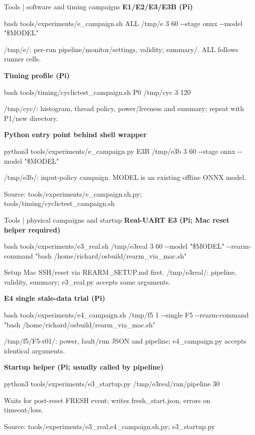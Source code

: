 \documentclass[aspectratio=169,12pt,t]{beamer}
\newcommand{\src}[1]{\par\vfill{\small\color{muted}Source: #1}}
\begin{document}
\begin{frame}{Tools | software and timing campaigns}
\textbf{E1/E2/E3/E3B (Pi)}\par{\ttfamily bash tools/experiments/e\_campaign.sh ALL /tmp/e 3 60 -{}-stage onnx -{}-model "\$MODEL"}\par /tmp/e/: per-run pipeline/monitor/settings, validity; summary/. ALL follows runner cells.\par\medskip
\textbf{Timing profile (Pi)}\par{\ttfamily bash tools/timing/cyclictest\_campaign.sh P0 /tmp/cyc 3 120}\par /tmp/cyc/: histogram, thread policy, power/liveness and summary; repeat with P1/new directory.\par\medskip
\textbf{Python entry point behind shell wrapper}\par{\ttfamily python3 tools/experiments/e\_campaign.py E3B /tmp/e3b 3 60 -{}-stage onnx -{}-model "\$MODEL"}\par /tmp/e3b/: input-policy campaign. MODEL is an existing offline ONNX model.\par\medskip
\src{tools/experiments/e\_campaign.{sh,py}; tools/timing/cyclictest\_campaign.sh}
\end{frame}
\begin{frame}{Tools | physical campaigns and startup}
\textbf{Real-UART E3 (Pi; Mac reset helper required)}\par{\ttfamily bash tools/experiments/e3\_real.sh /tmp/e3real 3 60 -{}-model "\$MODEL" -{}-rearm-command "bash /home/richard/osbuild/rearm\_via\_mac.sh"}\par Setup Mac SSH/reset via REARM\_SETUP.md first. /tmp/e3real/: pipeline, validity, summary; e3\_real.py accepts same arguments.\par\medskip
\textbf{E4 single stale-data trial (Pi)}\par{\ttfamily bash tools/experiments/e4\_campaign.sh /tmp/f5 1 -{}-single F5 -{}-rearm-command "bash /home/richard/osbuild/rearm\_via\_mac.sh"}\par /tmp/f5/F5-r01/: power, fault/run JSON and pipeline; e4\_campaign.py accepts identical arguments.\par\medskip
\textbf{Startup helper (Pi; usually called by pipeline)}\par{\ttfamily python3 tools/experiments/e3\_startup.py /tmp/e3real/run/pipeline 30}\par Waits for post-reset FRESH event; writes fresh\_start.json, errors on timeout/loss.\par\medskip
\src{tools/experiments/{e3\_real,e4\_campaign}.{sh,py}; e3\_startup.py}
\end{frame}
\end{document}
